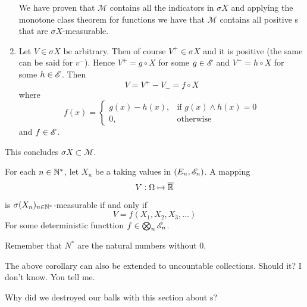 \documentclass{report}
\begin{document}
\begin{fancyproof}
\begin{enumerate}
		We have proven that $\mathcal{M}$ contains all the indicators in $\sigma X$ and applying the monotone class theorem for functions we have that 
		$\mathcal{M}$ contains all positive \rv s that are $\sigma X$-measurable.
		\item Let $V\in\sigma X$ be arbitrary. Then of course $V^{+}\in\sigma X$ and it is positive (the same can be said for $v^{-}$). Hence $V^{+}=g\circ X$ for some $g\in\mathscr{E}$ and $V^{-}=h\circ X$ for some $h\in\mathscr{E}$. Then 
		\[V=V^{+}-V_{-}=f\circ X\]
		where
		\[f(x)=\begin{cases}
			g(x)-h(x), &\text{if }g(x)\wedge h(x)=0\\
			0, &\text{otherwise}
		\end{cases}\]
		and $f\in\mathscr{E}$.
 	\end{enumerate}
 	This concludes $\sigma X\subset\mathcal{M}$.
\end{fancyproof}
\begin{corollary}
	For each $n\in\mathbb{N}^*$, let $X_n$ be a \rv{} taking values in $(E_n,\mathscr{E}_n)$. A mapping
	\[V:\Omega\mapsto\overline{\mathbb{R}}\]
	is $\sigma (X_n)_{n\in\mathbb{N}^*}$-measurable if and only if
	\[V=f(X_1,X_2,X_3,\ldots)\]
	For some deterministic functtion $f\in\bigotimes_n\mathscr{E}_n$.
\end{corollary}
Remember that $N^*$ are the natural numbers without 0.
\begin{remark}
	The above corollary can also be extended to uncountable collections. Should it? I don't know. You tell me.
\end{remark}
Why did we destroyed our balls with this section about \sa s?
\end{document}

